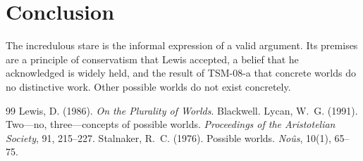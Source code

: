\documentclass{situationist-preprint}
\begin{document}
\section{Conclusion}

The incredulous stare is the informal expression of a valid argument. Its premises are a principle of conservatism that Lewis accepted, a belief that he acknowledged is widely held, and the result of TSM-08-a that concrete worlds do no distinctive work. Other possible worlds do not exist concretely.

\begin{thebibliography}{99}\small
{} Lewis, D. (1986). \emph{On the Plurality of Worlds}. Blackwell.
 Lycan, W.~G. (1991). Two---no, three---concepts of possible worlds. \emph{Proceedings of the Aristotelian Society}, 91, 215--227.
 Stalnaker, R.~C. (1976). Possible worlds. \emph{No\^us}, 10(1), 65--75.
\end{thebibliography}
\end{document}
